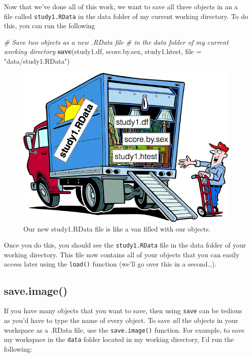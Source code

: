 \documentclass[]{book}
\newenvironment{Shaded}{\begin{snugshade}}{\end{snugshade}}
\newcommand{\KeywordTok}[1]{\textcolor[rgb]{0.13,0.29,0.53}{\textbf{#1}}}
\newcommand{\DataTypeTok}[1]{\textcolor[rgb]{0.13,0.29,0.53}{#1}}
\newcommand{\StringTok}[1]{\textcolor[rgb]{0.31,0.60,0.02}{#1}}
\newcommand{\CommentTok}[1]{\textcolor[rgb]{0.56,0.35,0.01}{\textit{#1}}}
\newcommand{\NormalTok}[1]{#1}
\theoremstyle{definition}
\theoremstyle{definition}
\theoremstyle{remark}
\begin{document}
Now that we've done all of this work, we want to save all three objects
in an a file called \texttt{study1.RData} in the data folder of my
current working directory. To do this, you can run the following

\begin{Shaded}
\begin{Highlighting}[]
\CommentTok{# Save two objects as a new .RData file}
\CommentTok{#   in the data folder of my current working directory}
\KeywordTok{save}\NormalTok{(study1.df, score.by.sex, study1.htest,}
     \DataTypeTok{file =} \StringTok{"data/study1.RData"}\NormalTok{)}
\end{Highlighting}
\end{Shaded}

\begin{figure}

{\centering \includegraphics[width=0.75\linewidth]{images/rdatavan} 

}

\caption{Our new study1.RData file is like a van filled with our objects.}\label{fig:rdatavan}
\end{figure}

Once you do this, you should see the \texttt{study1.RData} file in the
data folder of your working directory. This file now contains all of
your objects that you can easily access later using the \texttt{load()}
function (we'll go over this in a second\ldots{}).

\subsection{save.image()}\label{save.image}

If you have many objects that you want to save, then using \texttt{save}
can be tedious as you'd have to type the name of every object. To save
\emph{all} the objects in your workspace as a .RData file, use the
\texttt{save.image()} function. For example, to save my workspace in the
\texttt{data} folder located in my working directory, I'd run the
following:
\end{document}
